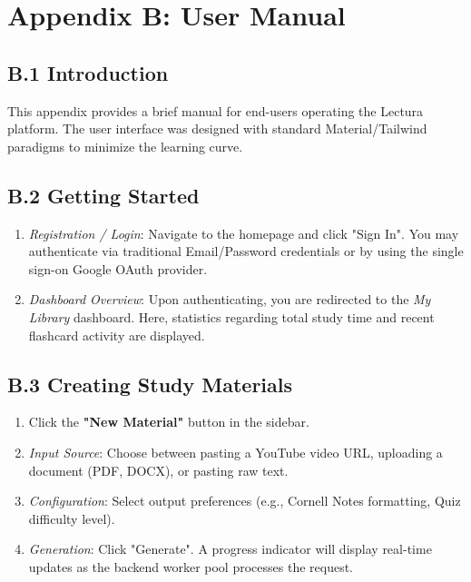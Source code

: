 \chapter{Appendix B: User Manual}

\section*{B.1 Introduction}
This appendix provides a brief manual for end-users operating the Lectura platform. The user interface was designed with standard Material/Tailwind paradigms to minimize the learning curve.

\section*{B.2 Getting Started}
\begin{enumerate}
    \item \textit{Registration / Login}: Navigate to the homepage and click "Sign In". You may authenticate via traditional Email/Password credentials or by using the single sign-on Google OAuth provider.
    \item \textit{Dashboard Overview}: Upon authenticating, you are redirected to the \textit{My Library} dashboard. Here, statistics regarding total study time and recent flashcard activity are displayed.
\end{enumerate}

\section*{B.3 Creating Study Materials}
\begin{enumerate}
    \item Click the \textbf{"New Material"} button in the sidebar.
    \item \textit{Input Source}: Choose between pasting a YouTube video URL, uploading a document (PDF, DOCX), or pasting raw text.
    \item \textit{Configuration}: Select output preferences (e.g., Cornell Notes formatting, Quiz difficulty level).
    \item \textit{Generation}: Click "Generate". A progress indicator will display real-time updates as the backend worker pool processes the request.
\end{enumerate}

